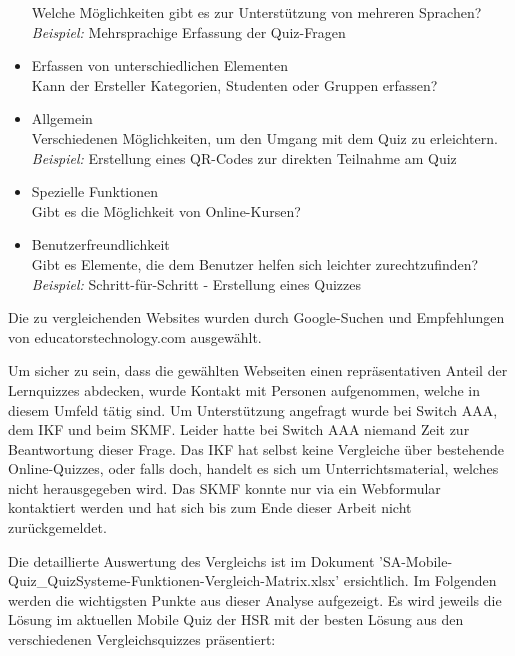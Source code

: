 \begin{itemize}
		Welche Möglichkeiten gibt es zur Unterstützung von mehreren Sprachen? \\
		\textit{Beispiel:} Mehrsprachige Erfassung der Quiz-Fragen
		\item Erfassen von unterschiedlichen Elementen \\
		Kann der Ersteller Kategorien, Studenten oder Gruppen erfassen?
		\item Allgemein \\
		Verschiedenen Möglichkeiten, um den Umgang mit dem Quiz zu erleichtern. \\
		\textit{Beispiel:} Erstellung eines QR-Codes zur direkten Teilnahme am Quiz
		\item Spezielle Funktionen \\
		Gibt es die Möglichkeit von Online-Kursen?
		\item Benutzerfreundlichkeit \\
		Gibt es Elemente, die dem Benutzer helfen sich leichter zurechtzufinden? \\
		\textit{Beispiel:} Schritt-für-Schritt - Erstellung eines Quizzes
	\end{itemize}
	
	\bigskip
	
	Die zu vergleichenden Websites wurden durch Google-Suchen und Empfehlungen von educatorstechnology.com \cite{educatorstechnology.com} ausgewählt.
		
	Um sicher zu sein, dass die gewählten Webseiten einen repräsentativen Anteil der Lernquizzes abdecken, wurde Kontakt mit Personen aufgenommen, welche in diesem Umfeld tätig sind. Um Unterstützung angefragt wurde bei Switch AAA, dem \acrfull{IKF} und beim \acrfull{SKMF}.
	Leider hatte bei Switch AAA niemand Zeit zur Beantwortung dieser Frage. Das \acrshort{IKF} hat selbst keine Vergleiche über bestehende Online-Quizzes, oder falls doch, handelt es sich um Unterrichtsmaterial, welches nicht herausgegeben wird. Das \acrshort{SKMF} konnte nur via ein Webformular kontaktiert werden und hat sich bis zum Ende dieser Arbeit nicht zurückgemeldet.
	
	\bigskip
	
	Die detaillierte Auswertung des Vergleichs ist im Dokument 'SA-Mobile-Quiz\_QuizSysteme-Funktionen-Vergleich-Matrix.xlsx' ersichtlich. Im Folgenden werden die wichtigsten Punkte aus dieser Analyse aufgezeigt. Es wird jeweils die Lösung im aktuellen Mobile Quiz der HSR mit der besten Lösung aus den verschiedenen Vergleichsquizzes präsentiert:
	

